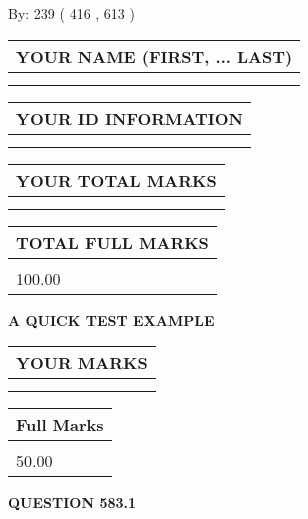 \documentclass[12pt]{article}
\begin{document}
   
\hspace{1.0in} By: 
 239 ( 416 ,  613 )
   
   
   
   
\newpage 
\setcounter{page}{ 
   583001 } 
   
   
   
   
\noindent\begin{tabular}{|l|}
\hline
YOUR NAME (FIRST, ... LAST)  \\
\hline
 \\ 
 \\ 
\hline
\end{tabular}
\hspace{0.05in} \begin{tabular}{|l|}
\hline
 YOUR   ID   INFORMATION  \\
\hline
 \\ 
 \\ 
\hline
\end{tabular}
   
   
\vspace{0.2in}\noindent\begin{tabular}{|l|}
\hline
YOUR TOTAL MARKS  \\
\hline
 \\ 
 \\ 
\hline
\end{tabular}
\hspace{0.05in} \begin{tabular}{|l|}
\hline
TOTAL FULL MARKS  \\
\hline
 \\ 
100.00 \\
\hline
\end{tabular}
   
   
 \vspace{0.2in}
{\LARGE {\textbf{ A QUICK TEST EXAMPLE}}}
   
   
  
\vspace{0.2in}
  
\noindent\begin{tabular}{|l|}
\hline
 YOUR MARKS  \\
\hline
 \\ 
 \\ 
\hline
\end{tabular}
\hspace{0.05in} \begin{tabular}{|l|}
\hline
 Full Marks  \\
\hline
 \\ 
50.00 \\
\hline
\end{tabular}
{\textbf{\Large{QUESTION
583.1 
}}}
  
\end{document}
